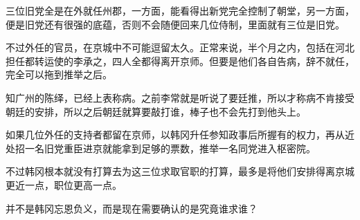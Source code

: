 三位旧党全是在外就任州郡，一方面，能看得出新党完全控制了朝堂，另一方面，便是旧党还有很强的底蕴，否则不会随便回来几位侍制，里面就有三位是旧党。

不过外任的官员，在京城中不可能逗留太久。正常来说，半个月之内，包括在河北担任都转运使的李承之，四人全都得离开京师。但要是他们各自告病，辞不就任，完全可以拖到推举之后。

知广州的陈绎，已经上表称病。之前李常就是听说了要廷推，所以才称病不肯接受朝廷的安排，所以之后朝廷就算要敲打谁，棒子也不会先打到他头上。

如果几位外任的支持者都留在京师，以韩冈升任参知政事后所握有的权力，再从近处招一名旧党重臣进京就能拿到足够的票数，推举一名同党进入枢密院。

不过韩冈根本就没有打算去为这三位求取官职的打算，最多是将他们安排得离京城更近一点，职位更高一点。

并不是韩冈忘恩负义，而是现在需要确认的是究竟谁求谁？
